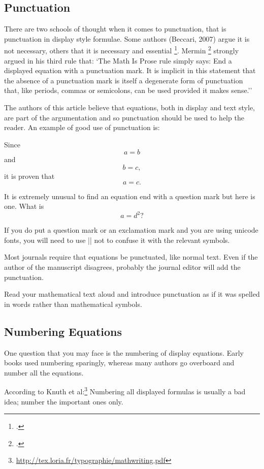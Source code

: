 {\subsection{Punctuation}

There are two schools of thought when it comes to punctuation, that is punctuation in display style formulae. Some authors (Beccari, 2007) argue it is not necessary, others that it is necessary and essential \footcite{guiggiani2008}. Mermin \footcite{mermin89} strongly argued in his third rule that:  `The
Math Is Prose rule simply says: End
a displayed equation with a punctuation
mark. It is implicit in this
statement that the absence of a punctuation
mark is itself a degenerate
form of punctuation that, like periods,
commas or semicolons, can be used
provided it makes sense.''

The authors of this article believe that equations, both in display and text style, are part of the argumentation
and so punctuation should be used to help the reader. An example of good use of punctuation is:


Since
\[ a=b \]
and
\[ b=c,\]
it is proven that
\[ a =c. \]

It is extremely unusual to find an equation end with a question mark but here is one. What is 
\[ a = d^2\mathrm{?} \]

If you do put a question mark or an exclamation mark and you are using unicode fonts,
you will need to use || not to confuse it with the relevant symbols.

Most journals require that equations be punctuated, like normal text. Even if the author of the manuscript disagrees, probably the journal editor will add the punctuation.

Read your mathematical text aloud and introduce punctuation as if it was spelled in words rather than mathematical symbols. 

\subsection{Numbering Equations}

One question that you may face is the numbering of display equations. Early books used numbering sparingly, whereas many authors go overboard and number all the equations.

According to Knuth et al:\footnote{\url{http://tex.loria.fr/typographie/mathwriting.pdf}}
Numbering all displayed formulas is usually a bad idea; number the important ones only.

}
